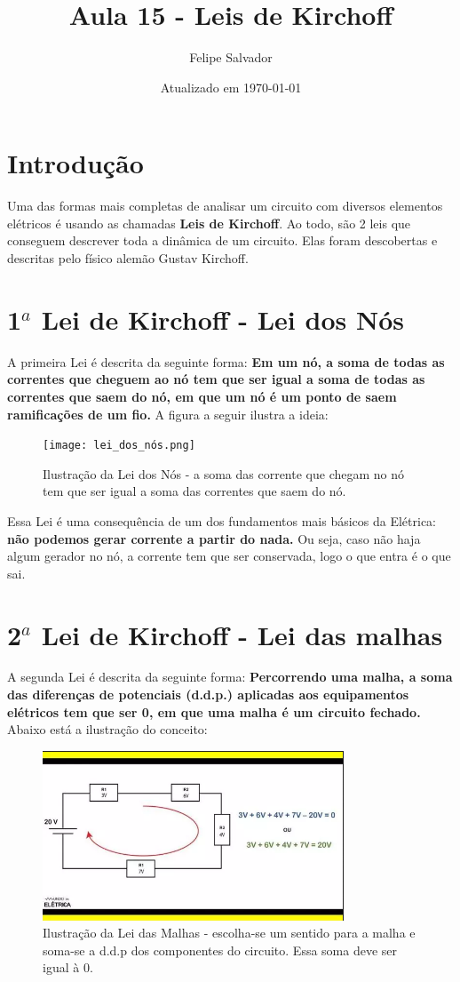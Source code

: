 \documentclass[12pt]{extarticle}
\title{Aula 15 - Leis de Kirchoff}
\author{Felipe Salvador}
\date{Atualizado em \today}
\newcommand{\<}{\langle}
\renewcommand{\>}{\rangle}
\theoremstyle{definition}
\begin{document}
\maketitle

\section{Introdução}
Uma das formas mais completas de analisar um circuito com diversos elementos elétricos é usando as chamadas \textbf{Leis de Kirchoff}. Ao todo, são 2 leis que conseguem descrever toda a dinâmica de um circuito. Elas foram descobertas e descritas pelo físico alemão Gustav Kirchoff.

\section{1$^a$ Lei de Kirchoff - Lei dos Nós}

A primeira Lei é descrita da seguinte forma: \textbf{Em um nó, a soma de todas as correntes que cheguem ao nó tem que ser igual a soma de todas as correntes que saem do nó, em que um nó é um ponto de saem ramificações de um fio.} A figura a seguir ilustra a ideia:
\begin{figure}[H]
    \centering
    \texttt{[image: lei\_dos\_nós.png]}
    \caption{Ilustração da Lei dos Nós - a soma das corrente que chegam no nó tem que ser igual a soma das correntes que saem do nó.}
    \label{fig:lei_dos_no}
\end{figure}

Essa Lei é uma consequência de um dos fundamentos mais básicos da Elétrica: \textbf{não podemos gerar corrente a partir do nada.} Ou seja, caso não haja algum gerador no nó, a corrente tem que ser conservada, logo o que entra é o que sai.

\section{2$^a$ Lei de Kirchoff - Lei das malhas}
A segunda Lei é descrita da seguinte forma: \textbf{Percorrendo uma malha, a soma das diferenças de potenciais (d.d.p.) aplicadas aos equipamentos elétricos tem que ser 0, em que uma malha é um circuito fechado.} Abaixo está a ilustração do conceito:
\begin{figure}[H]
    \centering
    \includegraphics[width=0.8\textwidth]{malha.png}
    \caption{Ilustração da Lei das Malhas - escolha-se um sentido para a malha e soma-se a d.d.p dos componentes do circuito. Essa soma deve ser igual à 0.}
    \label{fig:malha}
\end{figure}
\end{document}
